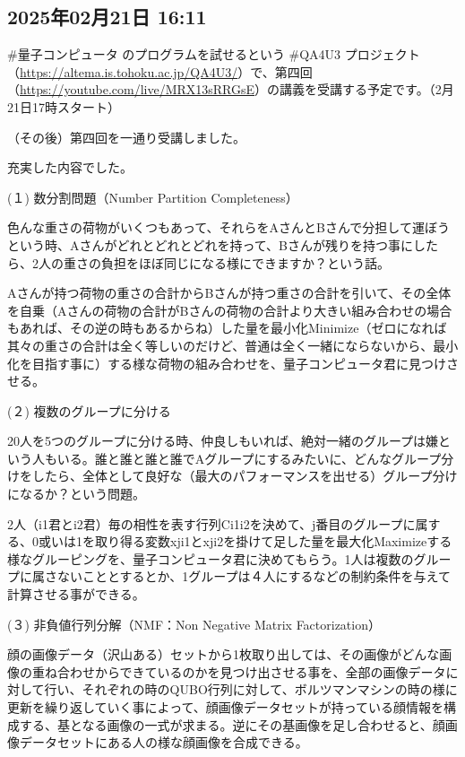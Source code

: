 \subsection*{2025年02月21日 16:11}

\#量子コンピュータ のプログラムを試せるという \#QA4U3 プロジェクト（\url{https://altema.is.tohoku.ac.jp/QA4U3/}）で、第四回（\url{https://youtube.com/live/MRX13sRRGsE}）の講義を受講する予定です。（2月21日17時スタート）

（その後）第四回を一通り受講しました。

充実した内容でした。

(１) 数分割問題（Number Partition Completeness）

色んな重さの荷物がいくつもあって、それらをAさんとBさんで分担して運ぼうという時、Aさんがどれとどれとどれを持って、Bさんが残りを持つ事にしたら、2人の重さの負担をほぼ同じになる様にできますか？という話。

Aさんが持つ荷物の重さの合計からBさんが持つ重さの合計を引いて、その全体を自乗（Aさんの荷物の合計がBさんの荷物の合計より大きい組み合わせの場合もあれば、その逆の時もあるからね）した量を最小化Minimize（ゼロになれば其々の重さの合計は全く等しいのだけど、普通は全く一緒にならないから、最小化を目指す事に）する様な荷物の組み合わせを、量子コンピュータ君に見つけさせる。

(２) 複数のグループに分ける

20人を5つのグループに分ける時、仲良しもいれば、絶対一緒のグループは嫌という人もいる。誰と誰と誰と誰でAグループにするみたいに、どんなグループ分けをしたら、全体として良好な（最大のパフォーマンスを出せる）グループ分けになるか？という問題。

2人（i1君とi2君）毎の相性を表す行列Ci1i2を決めて、j番目のグループに属する、0或いは1を取り得る変数xji1とxji2を掛けて足した量を最大化Maximizeする様なグルーピングを、量子コンピュータ君に決めてもらう。1人は複数のグループに属さないこととするとか、1グループは４人にするなどの制約条件を与えて計算させる事ができる。

(３) 非負値行列分解（NMF：Non Negative Matrix Factorization）

顔の画像データ（沢山ある）セットから1枚取り出しては、その画像がどんな画像の重ね合わせからできているのかを見つけ出させる事を、全部の画像データに対して行い、それぞれの時のQUBO行列に対して、ボルツマンマシンの時の様に更新を繰り返していく事によって、顔画像データセットが持っている顔情報を構成する、基となる画像の一式が求まる。逆にその基画像を足し合わせると、顔画像データセットにある人の様な顔画像を合成できる。

